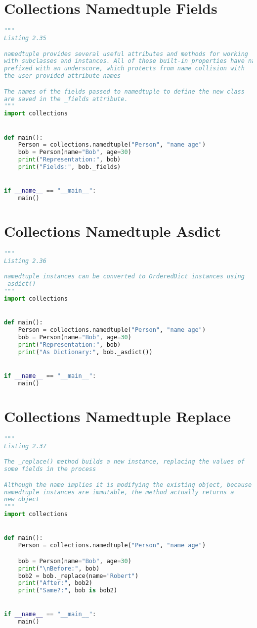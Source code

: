 \documentclass[a4paper,landscape]{report}
\begin{document}
\section{Collections Namedtuple Fields}
\begin{lstlisting}[language=Python]
"""
Listing 2.35

namedtuple provides several useful attributes and methods for working
with subclasses and instances. All of these built-in properties have names
prefixed with an underscore, which protects from name collision with
the user provided attribute names

The names of the fields passed to namedtuple to define the new class
are saved in the _fields attribute.
"""
import collections


def main():
    Person = collections.namedtuple("Person", "name age")
    bob = Person(name="Bob", age=30)
    print("Representation:", bob)
    print("Fields:", bob._fields)


if __name__ == "__main__":
    main()

\end{lstlisting}
\section{Collections Namedtuple Asdict}
\begin{lstlisting}[language=Python]
"""
Listing 2.36

namedtuple instances can be converted to OrderedDict instances using
_asdict()
"""
import collections


def main():
    Person = collections.namedtuple("Person", "name age")
    bob = Person(name="Bob", age=30)
    print("Representation:", bob)
    print("As Dictionary:", bob._asdict())


if __name__ == "__main__":
    main()

\end{lstlisting}
\section{Collections Namedtuple Replace}
\begin{lstlisting}[language=Python]
"""
Listing 2.37

The _replace() method builds a new instance, replacing the values of
some fields in the process

Although the name implies it is modifying the existing object, because
namedtuple instances are immutable, the method actually returns a
new object
"""
import collections


def main():
    Person = collections.namedtuple("Person", "name age")

    bob = Person(name="Bob", age=30)
    print("\nBefore:", bob)
    bob2 = bob._replace(name="Robert")
    print("After:", bob2)
    print("Same?:", bob is bob2)


if __name__ == "__main__":
    main()

\end{lstlisting}
\end{document}
